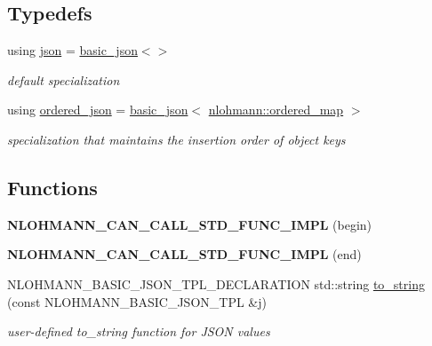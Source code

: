 \subsection*{Typedefs}
\begin{DoxyCompactItemize}
\item 
using \hyperlink{namespacenlohmann_a2bfd99e845a2e5cd90aeaf1b1431f474}{json} = \hyperlink{classnlohmann_1_1basic__json}{basic\+\_\+json}$<$$>$
\begin{DoxyCompactList}\small\item\em default specialization \end{DoxyCompactList}\item 
using \hyperlink{namespacenlohmann_ad53cef358adfa7f07cea23eb1e28b9ea}{ordered\+\_\+json} = \hyperlink{classnlohmann_1_1basic__json}{basic\+\_\+json}$<$ \hyperlink{structnlohmann_1_1ordered__map}{nlohmann\+::ordered\+\_\+map} $>$
\begin{DoxyCompactList}\small\item\em specialization that maintains the insertion order of object keys \end{DoxyCompactList}\end{DoxyCompactItemize}
\subsection*{Functions}
\begin{DoxyCompactItemize}
\item 
\mbox{\label{namespacenlohmann_a6ea7ce1fcdd8c94f6c3221c63356f39b}} 
{\bfseries N\+L\+O\+H\+M\+A\+N\+N\+\_\+\+C\+A\+N\+\_\+\+C\+A\+L\+L\+\_\+\+S\+T\+D\+\_\+\+F\+U\+N\+C\+\_\+\+I\+M\+PL} (begin)
\item 
\mbox{\label{namespacenlohmann_a2fe3cfce480685121828a64e2da31eb4}} 
{\bfseries N\+L\+O\+H\+M\+A\+N\+N\+\_\+\+C\+A\+N\+\_\+\+C\+A\+L\+L\+\_\+\+S\+T\+D\+\_\+\+F\+U\+N\+C\+\_\+\+I\+M\+PL} (end)
\item 
N\+L\+O\+H\+M\+A\+N\+N\+\_\+\+B\+A\+S\+I\+C\+\_\+\+J\+S\+O\+N\+\_\+\+T\+P\+L\+\_\+\+D\+E\+C\+L\+A\+R\+A\+T\+I\+ON std\+::string \hyperlink{namespacenlohmann_a6ce645a0b8717757e096a5b5773b7a16}{to\+\_\+string} (const N\+L\+O\+H\+M\+A\+N\+N\+\_\+\+B\+A\+S\+I\+C\+\_\+\+J\+S\+O\+N\+\_\+\+T\+PL \&j)
\begin{DoxyCompactList}\small\item\em user-\/defined to\+\_\+string function for J\+S\+ON values \end{DoxyCompactList}\end{DoxyCompactItemize}


